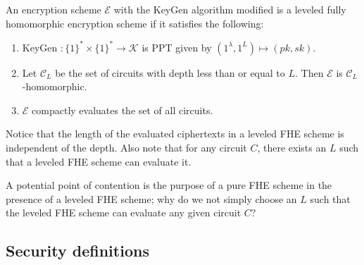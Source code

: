 \begin{definition}
An encryption scheme $\mathcal{E}$ with the KeyGen algorithm modified is a leveled fully homomorphic encryption scheme if it satisfies the following:
\begin{enumerate}[label={$\bullet$}]
    \item KeyGen $\colon \{1\}^* \times \{1\}^* \to \mathcal{K}$ is PPT given by $(1^{\lambda},1^L) \mapsto (pk,sk)$.
    \item Let $\mathcal{C}_L$ be the set of circuits with depth less than or equal to $L$. Then $\mathcal{E}$ is $\mathcal{C}_L$-homomorphic.
    \item $\mathcal{E}$ compactly evaluates the set of all circuits. 
\end{enumerate}
\end{definition}
\begin{remark}
    Notice that the length of the evaluated ciphertexts in a leveled FHE scheme is independent of the depth.
    Also note that for any circuit $C$, there exists an $L$ such that a leveled FHE scheme can evaluate it.
\end{remark}

A potential point of contention is the purpose of a pure FHE scheme in the presence of a leveled FHE scheme; why do we not simply choose an $L$ such that the leveled FHE scheme can evaluate any given circuit $C$?


\subsection*{Security definitions}

